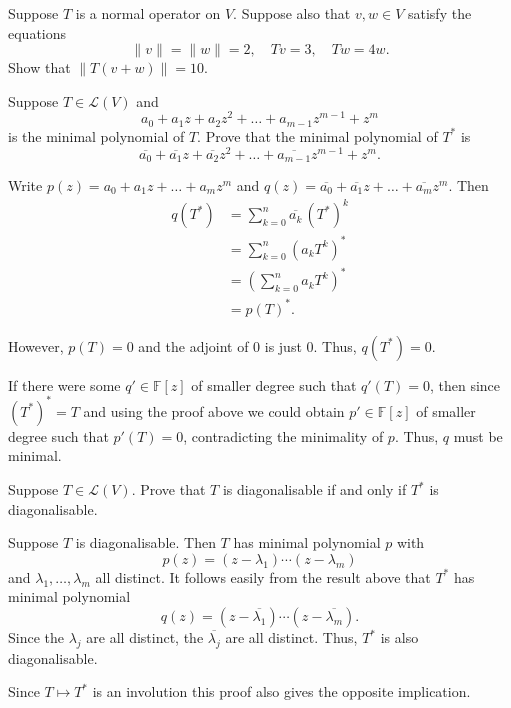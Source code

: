 \documentclass[12 pt, letterpaper]{hmcpset}
\begin{document}
\pagebreak

\begin{problem}[23]
	Suppose $T$ is a normal operator on $V$. Suppose also that $v, w \in V$ satisfy the equations
	\[
		\lVert v \rVert = \lVert w \rVert = 2, \quad Tv = 3, \quad Tw = 4w.
	\]
	Show that $\lVert T(v + w) \rVert = 10$.
\end{problem}

\pagebreak

\begin{problem}[24]
	Suppose $T \in \mathcal{L}(V)$ and
	\[
		a_{0} + a_{1} z + a_{2} z^{2} + \dots + a_{m - 1} z^{m - 1} + z^{m}
	\]
	is the minimal polynomial of $T$. Prove that the minimal polynomial of $T^{*}$ is
	\[
		\overline{a_{0}} + \overline{a_{1}} z + \overline{a_{2}} z^{2} + \dots + \overline{a_{m - 1}} z^{m - 1} + z^{m}.
	\]
\end{problem}

\begin{solution}
	Write $p(z) = a_{0} + a_{1} z + \dots + a_{m} z^{m}$ and $q(z) = \overline{a_{0}} + \overline{a_{1}} z + \dots + \overline{a_{m}} z^{m}$. Then
	\begin{align*}
		q(T^{*}) & = \sum_{k = 0}^{n} \overline{a_{k}} \, (T^{*})^{k} \\
			 & = \sum_{k = 0}^{n} (a_{k} T^{k})^{*} \\
			 & = \left ( \sum_{k = 0}^{n} a_{k} T^{k} \right )^{*} \\
			 & = p(T)^{*}.
	\end{align*}

	However, $p(T) = 0$ and the adjoint of $0$ is just $0$. Thus, $q(T^{*}) = 0$.

	If there were some $q' \in \mathbb{F}[z]$ of smaller degree such that $q'(T) = 0$, then since  $(T^{*})^{*} = T$ and using the proof above we could obtain $p' \in \mathbb{F}[z]$ of smaller degree such that $p'(T) = 0$, contradicting the minimality of $p$. Thus, $q$ must be minimal.
\end{solution}

\pagebreak

\begin{problem}[25]
	Suppose $T \in \mathcal{L}(V)$. Prove that $T$ is diagonalisable if and only if $T^{*}$ is diagonalisable.
\end{problem}

\begin{solution}
	Suppose $T$ is diagonalisable. Then $T$ has minimal polynomial $p$ with
	\[
		p(z) = (z - \lambda_{1}) \cdots (z - \lambda_{m})
	\]
	and $\lambda_{1}, \dots, \lambda_{m}$ all distinct. It follows easily from the result above that $T^{*}$ has minimal polynomial
	\[
		q(z) = (z - \overline{\lambda_{1}}) \cdots (z - \overline{\lambda_{m}}).
	\]
	Since the $\lambda_{j}$ are all distinct, the $\overline{\lambda_{j}}$ are all distinct. Thus, $T^{*}$ is also diagonalisable.

	Since $T \mapsto T^{*}$ is an involution this proof also gives the opposite implication.
\end{solution}
\end{document}
